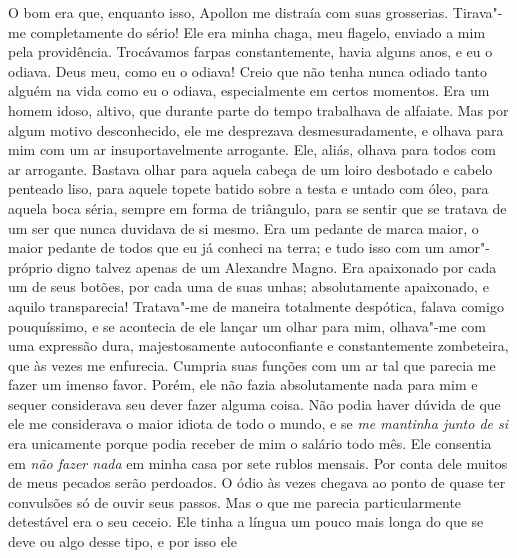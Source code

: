 
O bom era que, enquanto isso, Apollon me distraía com suas grosserias.
Tirava"-me completamente do sério! Ele era minha chaga, meu flagelo,
enviado a mim pela providência. Trocávamos farpas constantemente,
havia alguns anos, e eu o odiava. Deus meu, como eu o odiava! Creio que
não tenha nunca odiado tanto alguém na vida como eu o odiava,
especialmente em certos momentos. Era um homem idoso, altivo, que
durante parte do tempo trabalhava de alfaiate. Mas por algum motivo
desconhecido, ele me desprezava desmesuradamente, e olhava para mim com
um ar insuportavelmente arrogante. Ele, aliás, olhava para todos com ar
arrogante. Bastava olhar para aquela cabeça de um loiro desbotado e
cabelo penteado liso, para aquele topete batido sobre a testa e untado
com óleo, para aquela boca séria, sempre em forma de triângulo, para se
sentir que se tratava de um ser que nunca duvidava de si mesmo. Era um
pedante de marca maior, o maior pedante de todos que eu já conheci na
terra; e tudo isso com um amor"-próprio digno talvez apenas de um
Alexandre Magno. Era apaixonado por cada um de seus botões, por cada
uma de suas unhas; absolutamente apaixonado, e aquilo transparecia!
Tratava"-me de maneira totalmente despótica, falava comigo pouquíssimo,
e se acontecia de ele lançar um olhar para mim, olhava"-me com uma
expressão dura, majestosamente autoconfiante e constantemente
zombeteira, que às vezes me enfurecia. Cumpria suas funções com um ar
tal que parecia me fazer um imenso favor. Porém, ele não fazia
absolutamente nada para mim e sequer considerava seu dever fazer alguma
coisa. Não podia haver dúvida de que ele me considerava o maior idiota
de todo o mundo, e se \textit{me mantinha junto de si} era unicamente porque
podia receber de mim o salário todo mês. Ele consentia em \textit{não fazer
nada} em minha casa por sete rublos mensais. Por conta dele muitos de
meus pecados serão perdoados. O ódio às vezes chegava ao ponto de quase
ter convulsões só de ouvir seus passos. Mas o que me parecia
particularmente detestável era o seu ceceio. Ele tinha a língua um
pouco mais longa do que se deve ou algo desse tipo, e por isso ele
